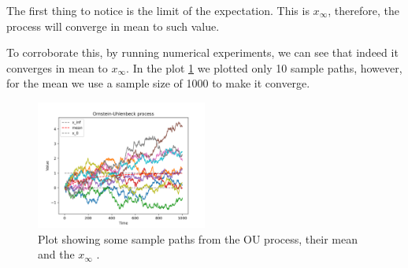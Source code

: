\documentclass[a4paper,12pt]{article} %
\begin{document}
The first thing to notice is the limit of the expectation. This is \(x_\infty \), therefore, the process will converge in mean to such value.

To corroborate this, by running numerical experiments, we can see that indeed it converges in mean to \(x_\infty \). In the plot \ref{fig:my_image} we plotted only 10 sample paths, however, for the mean we use a sample size of 1000 to make it converge.
\begin{figure}[h!]
    \centering
    \includegraphics[width=0.5\textwidth]{plots/ou_process.png} %
    \caption{Plot showing some sample paths from the OU process, their mean and the \(x_\infty \) .}
    \label{fig:my_image}
\end{figure}
\end{document}
